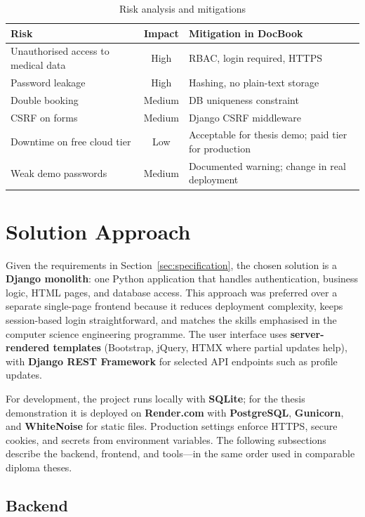 \begin{table}[htbp]
  \centering
  \caption{Risk analysis and mitigations}
  \begin{tabular}{@{}p{4.5cm}cl@{}}
    \toprule
    Risk & Impact & Mitigation in DocBook \\
    \midrule
    Unauthorised access to medical data & High & RBAC, login required, HTTPS \\
    Password leakage & High & Hashing, no plain-text storage \\
    Double booking & Medium & DB uniqueness constraint \\
    CSRF on forms & Medium & Django CSRF middleware \\
    Downtime on free cloud tier & Low & Acceptable for thesis demo; paid tier for production \\
    Weak demo passwords & Medium & Documented warning; change in real deployment \\
    \bottomrule
  \end{tabular}
\end{table}

\section{Solution Approach}

Given the requirements in Section~\ref{sec:specification}, the chosen solution is a \textbf{Django monolith}: one Python application that handles authentication, business logic, HTML pages, and database access. This approach was preferred over a separate single-page frontend because it reduces deployment complexity, keeps session-based login straightforward, and matches the skills emphasised in the computer science engineering programme. The user interface uses \textbf{server-rendered templates} (Bootstrap, jQuery, HTMX where partial updates help), with \textbf{Django REST Framework} for selected API endpoints such as profile updates.

For development, the project runs locally with \textbf{SQLite}; for the thesis demonstration it is deployed on \textbf{Render.com} with \textbf{PostgreSQL}, \textbf{Gunicorn}, and \textbf{WhiteNoise} for static files. Production settings enforce HTTPS, secure cookies, and secrets from environment variables. The following subsections describe the backend, frontend, and tools---in the same order used in comparable diploma theses.

\subsection{Backend}

